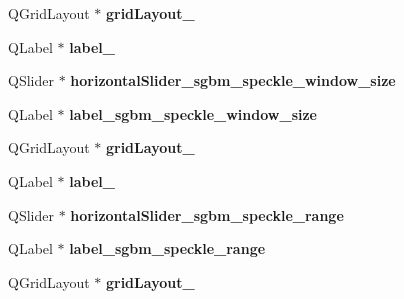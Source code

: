 \begin{DoxyCompactItemize}
\item 
\hypertarget{class_ui__stereo_match_param_form_a034035cb925a630f635021aa1e8e62e5}{}Q\+Grid\+Layout $\ast$ {\bfseries grid\+Layout\+\_}\label{class_ui__stereo_match_param_form_a034035cb925a630f635021aa1e8e62e5}

\item 
\hypertarget{class_ui__stereo_match_param_form_aae8a30fe4ca18330a3288af865c90b66}{}Q\+Label $\ast$ {\bfseries label\+\_}\label{class_ui__stereo_match_param_form_aae8a30fe4ca18330a3288af865c90b66}

\item 
\hypertarget{class_ui__stereo_match_param_form_a7a3d6c75d3aa5959d64931946ef72ece}{}Q\+Slider $\ast$ {\bfseries horizontal\+Slider\+\_\+sgbm\+\_\+speckle\+\_\+window\+\_\+size}\label{class_ui__stereo_match_param_form_a7a3d6c75d3aa5959d64931946ef72ece}

\item 
\hypertarget{class_ui__stereo_match_param_form_a0cc71d793ec70679a77b2c40bbb5d8b3}{}Q\+Label $\ast$ {\bfseries label\+\_\+sgbm\+\_\+speckle\+\_\+window\+\_\+size}\label{class_ui__stereo_match_param_form_a0cc71d793ec70679a77b2c40bbb5d8b3}

\item 
\hypertarget{class_ui__stereo_match_param_form_a350d90dfb49ea1741439502243a7dfc6}{}Q\+Grid\+Layout $\ast$ {\bfseries grid\+Layout\+\_}\label{class_ui__stereo_match_param_form_a350d90dfb49ea1741439502243a7dfc6}

\item 
\hypertarget{class_ui__stereo_match_param_form_a336a5cb093fed5588f5555f55604e199}{}Q\+Label $\ast$ {\bfseries label\+\_}\label{class_ui__stereo_match_param_form_a336a5cb093fed5588f5555f55604e199}

\item 
\hypertarget{class_ui__stereo_match_param_form_ac7dc5ea062016d990b47e67c60106c8a}{}Q\+Slider $\ast$ {\bfseries horizontal\+Slider\+\_\+sgbm\+\_\+speckle\+\_\+range}\label{class_ui__stereo_match_param_form_ac7dc5ea062016d990b47e67c60106c8a}

\item 
\hypertarget{class_ui__stereo_match_param_form_aba6eea3b628358b810caef4e74847f64}{}Q\+Label $\ast$ {\bfseries label\+\_\+sgbm\+\_\+speckle\+\_\+range}\label{class_ui__stereo_match_param_form_aba6eea3b628358b810caef4e74847f64}

\item 
\hypertarget{class_ui__stereo_match_param_form_a190c5e5ece68d55fbd7402c426b8ba35}{}Q\+Grid\+Layout $\ast$ {\bfseries grid\+Layout\+\_}\label{class_ui__stereo_match_param_form_a190c5e5ece68d55fbd7402c426b8ba35}


\end{DoxyCompactItemize}
